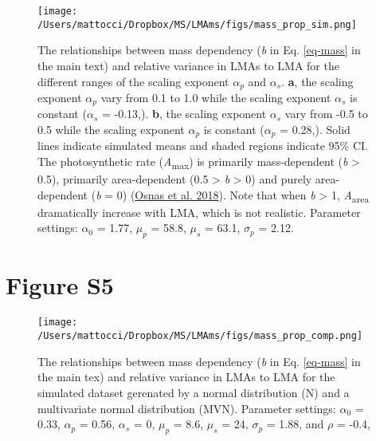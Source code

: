 \documentclass[
  12pt,
  letterpaper,
  DIV=11,
  numbers=noendperiod]{scrartcl}
\begin{document}
\begin{figure}

{\centering \texttt{[image: /Users/mattocci/Dropbox/MS/LMAms/figs/mass\_prop\_sim.png]}

}

\caption{\label{fig-mass_prop_sim}The relationships between mass
dependency (\emph{b} in Eq. \ref{eq-mass} in the main text) and relative
variance in LMAs to LMA for the different ranges of the scaling exponent
\(\alpha_p\) and \(\alpha_s\). \textbf{a}, the scaling exponent
\(\alpha_p\) vary from 0.1 to 1.0 while the scaling exponent
\(\alpha_s\) is constant (\(\alpha_s\) = -0.13,). \textbf{b}, the
scaling exponent \(\alpha_s\) vary from -0.5 to 0.5 while the scaling
exponent \(\alpha_p\) is constant (\(\alpha_p\) = 0.28,). Solid lines
indicate simulated means and shaded regions indicate 95\% CI. The
photosynthetic rate (\emph{A}\textsubscript{max}) is primarily
mass-dependent (\emph{b} \textgreater{} 0.5), primarily area-dependent
(0.5 \textgreater{} \emph{b} \textgreater{} 0) and purely area-dependent
(\emph{b} = 0) (\protect\hyperlink{ref-Osnas2018}{Osnas et al. 2018}).
Note that when \emph{b} \textgreater{} 1, \emph{A}\textsubscript{area}
dramatically increase with LMA, which is not realistic. Parameter
settings: \(\alpha_0\) = 1.77, \(\mu_p\) = 58.8, \(\mu_s\) = 63.1,
\(\sigma_p\) = 2.12.}

\end{figure}

\newpage

\hypertarget{figure-s5}{%
\section{Figure S5}\label{figure-s5}}

\begin{figure}

{\centering \texttt{[image: /Users/mattocci/Dropbox/MS/LMAms/figs/mass\_prop\_comp.png]}

}

\caption{\label{fig-mass_prop_comp}The relationships between mass
dependency (\emph{b} in Eq. \ref{eq-mass} in the main tex) and relative
variance in LMAs to LMA for the simulated dataset gerenated by a normal
distribution (N) and a multivariate normal distribution (MVN). Parameter
settings: \(\alpha_0\) = 0.33, \(\alpha_p\) = 0.56, \(\alpha_s\) = 0,
\(\mu_p\) = 8.6, \(\mu_s\) = 24, \(\sigma_p\) = 1.88, and \(\rho\) =
-0.4,}

\end{figure}
\end{document}
